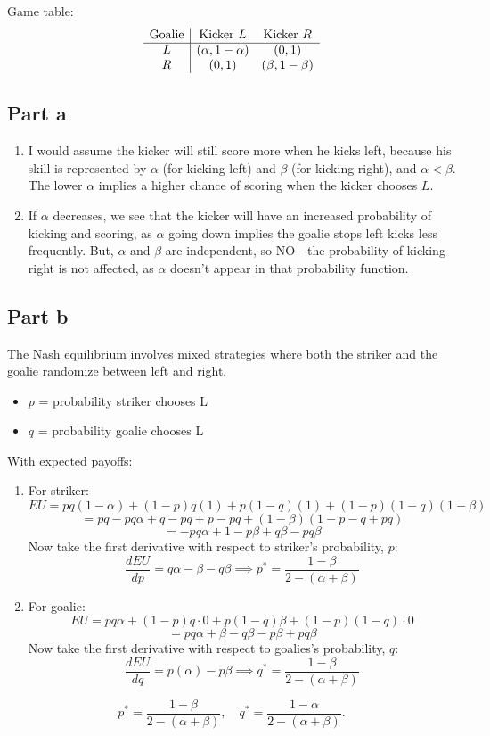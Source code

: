 \documentclass{article}
\begin{document}
Game table: 
\[
\begin{array}{c|cc}
\text{Goalie} & \text{Kicker \( L \)} & \text{Kicker \( R \)} \\ \hline
L & (\alpha, 1 - \alpha) & (0, 1) \\
R & (0, 1) & (\beta, 1 - \beta) \\
\end{array}
\]

\subsection{Part a}
\begin{enumerate}
    \item I would assume the kicker will still score more when he kicks left, because his skill is represented by \( \alpha \) (for kicking left) and \( \beta \) (for kicking right), and \( \alpha < \beta \). The lower \( \alpha \) implies a higher chance of scoring when the kicker chooses \( L \).

    \item  If \( \alpha \) decreases, we see that the kicker will have an increased probability of kicking and scoring, as \( \alpha \) going down implies the goalie stops left kicks less frequently. But, \( \alpha \) and \( \beta \) are independent, so NO - the probability of kicking right is not affected, as \( \alpha \) doesn't appear in that probability function. 
\end{enumerate}

\subsection{Part b}
The Nash equilibrium involves mixed strategies where both the striker and the goalie randomize between left and right. 
\begin{itemize}
    \item \( p \) = probability striker chooses L
    \item \( q \) = probability goalie chooses L
\end{itemize}
With expected payoffs:
\begin{enumerate}
    \item For striker: \[
    EU = pq(1 - \alpha) + (1 - p)q(1) + p(1 - q)(1) + (1 - p)(1 - q)(1 - \beta)
    \]
    \[
    = pq - pq\alpha + q -pq + p - pq + (1-\beta)(1 - p - q + pq)
    \]
    \[
    = - pq\alpha + 1 - p\beta + q\beta - pq\beta
    \]
    Now take the first derivative with respect to striker's probability, $p$: \[
    \frac{dEU}{dp} =  q\alpha - \beta - q\beta \implies p^* = \frac{1 - \beta}{2 - (\alpha + \beta)}
    \]
    \item For goalie: \[
    EU = pq\alpha + (1-p)q\cdot 0 + p(1-q)\beta + (1-p)(1-q)\cdot 0
    \]
    \[
    =pq\alpha + \beta - q\beta -p\beta + pq\beta
    \]
    Now take the first derivative with respect to goalies's probability, $q$: \[
    \frac{dEU}{dq} = p(\alpha) - p\beta \implies q^* = \frac{1 - \beta}{2 - (\alpha + \beta)}
    \] 
\end{enumerate}
\[
p^* = \frac{1 - \beta}{2 - (\alpha + \beta)}, \quad q^* = \frac{1 - \alpha}{2 - (\alpha + \beta)}.
\]
\end{document}
